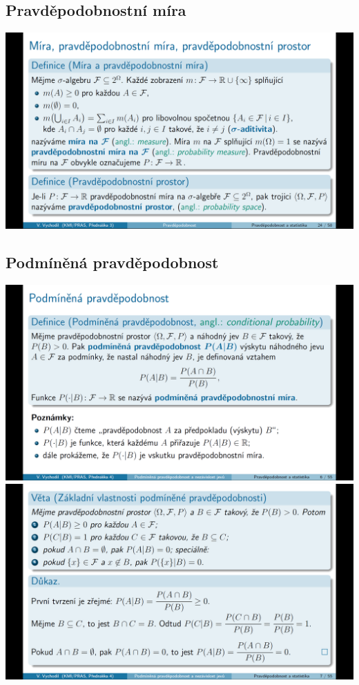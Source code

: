 \documentclass[12pt,a4paper]{article}
\begin{document}
\subsection{Pravděpodobnostní míra}
\begin{center}
	\includegraphics[scale=0.32]{img/pravdepod_mira}
\end{center}

\subsection{Podmíněná pravděpodobnost}
\begin{center}
	\includegraphics[scale=0.32]{img/podminena_pravdepod}
	\includegraphics[scale=0.32]{img/podminena_pravdepod_properties}
\end{center}
\end{document}
